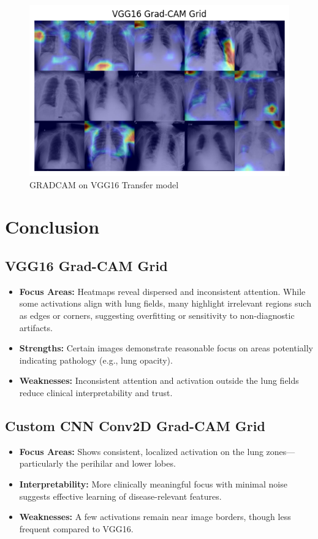 \documentclass{article}
\begin{document}
\begin{figure}[ht] %
    \centering
    \includegraphics[width=1.0\linewidth]{vgg16gradcam.png}
    \caption{GRADCAM on VGG16 Transfer model}
    \label{fig:gradcam_vgg16}
\end{figure}




\section{Conclusion}

\subsection{VGG16 Grad-CAM Grid}
\begin{itemize}
    \item \textbf{Focus Areas:} Heatmaps reveal dispersed and inconsistent attention. While some activations align with lung fields, many highlight irrelevant regions such as edges or corners, suggesting overfitting or sensitivity to non-diagnostic artifacts.
    \item \textbf{Strengths:} Certain images demonstrate reasonable focus on areas potentially indicating pathology (e.g., lung opacity).
    \item \textbf{Weaknesses:} Inconsistent attention and activation outside the lung fields reduce clinical interpretability and trust.
\end{itemize}

\subsection{Custom CNN Conv2D Grad-CAM Grid}
\begin{itemize}
    \item \textbf{Focus Areas:} Shows consistent, localized activation on the lung zones—particularly the perihilar and lower lobes.
    \item \textbf{Interpretability:} More clinically meaningful focus with minimal noise suggests effective learning of disease-relevant features.
    \item \textbf{Weaknesses:} A few activations remain near image borders, though less frequent compared to VGG16.
\end{itemize}
\end{document}
